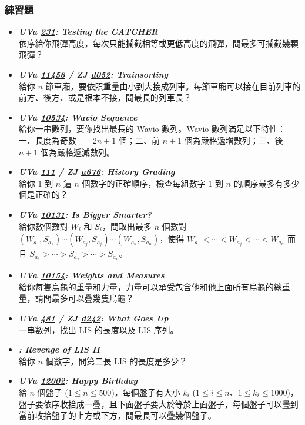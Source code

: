 \subsubsection*{練習題}
\begin{itemize}[label={\Checkmark}]
\item \textbf{\textit{UVa \href{http://uva.onlinejudge.org/external/2/231.html}{231}: Testing the CATCHER}}\\
依序給你飛彈高度，每次只能攔截相等或更低高度的飛彈，問最多可攔截幾顆飛彈？
\item \textbf{\textit{UVa \href{http://uva.onlinejudge.org/external/114/11456.html}{11456} / ZJ \href{http://zerojudge.tw/ShowProblem?problemid=d052}{d052}: Trainsorting}}\\
給你 $n$ 節車廂，要依照重量由小到大接成列車。每節車廂可以接在目前列車的前方、後方、或是根本不接，問最長的列車長？
\item \textbf{\textit{UVa \href{http://uva.onlinejudge.org/external/105/10534.html}{10534}: Wavio Sequence}}\\
給你一串數列，要你找出最長的 Wavio 數列。Wavio 數列滿足以下特性：一、長度為奇數－－$2n+1$ 個；二、前 $n+1$ 個為嚴格遞增數列；三、後 $n+1$ 個為嚴格遞減數列。
\item \textbf{\textit{UVa \href{http://uva.onlinejudge.org/external/1/111.html}{111} / ZJ \href{http://zerojudge.tw/ShowProblem?problemid=a676}{a676}: History Grading}}\\
給你 $1$ 到 $n$ 這 $n$ 個數字的正確順序，檢查每組數字 $1$ 到 $n$ 的順序最多有多少個是正確的？
\item \textbf{\textit{UVa \href{http://uva.onlinejudge.org/external/101/10131.html}{10131}: Is Bigger Smarter?}}\\
給你數個數對 $W_i$ 和 $S_i$，問取出最多 $n$ 個數對 $(W_{a_1}, S_{a_1})\cdots{(W_{a_j}, S_{a_j})}\cdots{(W_{a_n}, S_{a_n})}$，使得 $W_{a_1}<\cdots{}<W_{a_j}<\cdots{}<W_{a_n}$ 而且 $S_{a_1}>\cdots{}>S_{a_j}>\cdots{}>S_{a_n}$。
\item \textbf{\textit{UVa \href{http://uva.onlinejudge.org/external/101/10154.html}{10154}: Weights and Measures}}\\
給你每隻烏龜的重量和力量，力量可以承受包含他和他上面所有烏龜的總重量，請問最多可以疊幾隻烏龜？
\item \textbf{\textit{UVa \href{http://uva.onlinejudge.org/external/4/481.html}{481} / ZJ \href{http://zerojudge.tw/ShowProblem?problemid=d242}{d242}: What Goes Up}}\\
一串數列，找出 LIS 的長度以及 LIS 序列。
\item \textbf{\textit{: Revenge of LIS II}}\\
給你 $n$ 個數字，問第二長 LIS 的長度是多少？
\item \textbf{\textit{UVa \href{http://uva.onlinejudge.org/external/120/12002.html}{12002}: Happy Birthday}}\\
給 $n$ 個盤子 ($1\leq{n}\leq{500}$)，每個盤子有大小 $k_i$ ($1\leq{i}\leq{n}$、$1\leq{k_i}\leq{1000}$)，盤子要依序收拾成一疊，且下面盤子要大於等於上面盤子，每個盤子可以疊到當前收拾盤子的上方或下方，問最長可以疊幾個盤子。
\end{itemize}
